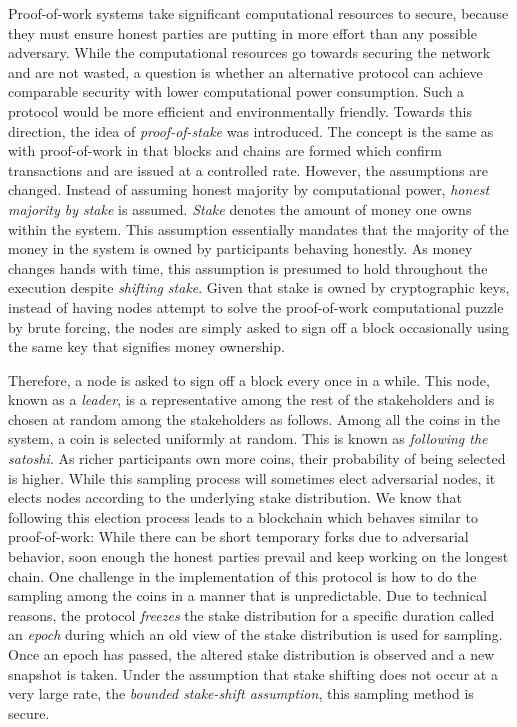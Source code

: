 Proof-of-work systems take significant computational resources to secure,
because they must ensure honest parties are putting in more effort than any
possible adversary. While the computational resources go towards securing the
network and are not wasted, a question is whether an alternative protocol can
achieve comparable security with lower computational power consumption. Such a
protocol would be more efficient and environmentally friendly. Towards this
direction, the idea of \emph{proof-of-stake} was introduced. The concept is the
same as with proof-of-work in that blocks and chains are formed which confirm
transactions and are issued at a controlled rate. However, the assumptions are
changed. Instead of assuming honest majority by computational power,
\emph{honest majority by stake} is assumed. \emph{Stake} denotes the amount of
money one owns within the system. This assumption essentially mandates that the
majority of the money in the system is owned by participants behaving honestly.
As money changes hands with time, this assumption is presumed to hold throughout
the execution despite \emph{shifting stake}. Given that stake is owned by
cryptographic keys, instead of having nodes attempt to solve the proof-of-work
computational puzzle by brute forcing, the nodes are simply asked to sign off
a block occasionally using the same key that signifies money ownership.

Therefore, a node is asked to sign off a block every once in a while. This node,
known as a \emph{leader}, is a representative among the rest of the stakeholders
and is chosen at random among the stakeholders as follows. Among all the coins
in the system, a coin is selected uniformly at random.
This is known as \emph{following the satoshi}.
As richer participants
own more coins, their probability of being selected is higher. While this
sampling process will sometimes elect adversarial nodes, it elects nodes
according to the underlying stake distribution. We know that following this
election process leads to a blockchain which behaves similar to proof-of-work:
While there can be short temporary forks due to adversarial behavior, soon
enough the honest parties prevail and keep working on the longest chain. One
challenge in the implementation of this protocol is how to do the sampling among
the coins in a manner that is unpredictable. Due to technical reasons, the
protocol \emph{freezes} the stake distribution for a specific duration called an
\emph{epoch} during which an old view of the stake distribution is used for
sampling. Once an epoch has passed, the altered stake distribution is observed
and a new snapshot is taken. Under the assumption that stake shifting does not
occur at a very large rate, the \emph{bounded stake-shift assumption}, this
sampling method is secure.

